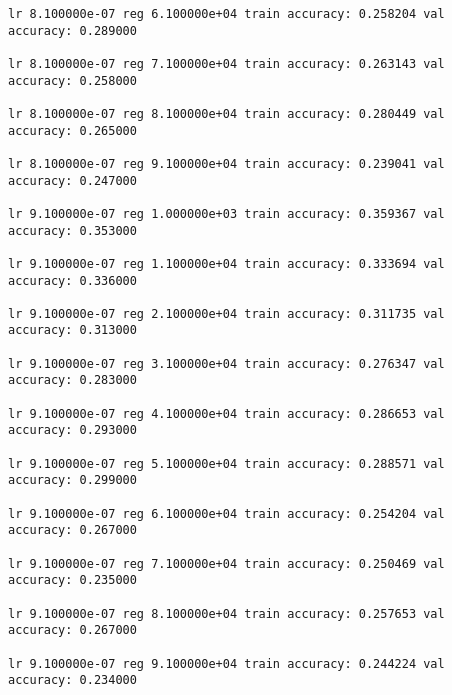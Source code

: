 \documentclass[11pt]{article}
\begin{document}
\begin{Verbatim}[commandchars=\\\{\}]
lr 8.100000e-07 reg 6.100000e+04 train accuracy: 0.258204 val accuracy: 0.289000

lr 8.100000e-07 reg 7.100000e+04 train accuracy: 0.263143 val accuracy: 0.258000

lr 8.100000e-07 reg 8.100000e+04 train accuracy: 0.280449 val accuracy: 0.265000

lr 8.100000e-07 reg 9.100000e+04 train accuracy: 0.239041 val accuracy: 0.247000

lr 9.100000e-07 reg 1.000000e+03 train accuracy: 0.359367 val accuracy: 0.353000

lr 9.100000e-07 reg 1.100000e+04 train accuracy: 0.333694 val accuracy: 0.336000

lr 9.100000e-07 reg 2.100000e+04 train accuracy: 0.311735 val accuracy: 0.313000

lr 9.100000e-07 reg 3.100000e+04 train accuracy: 0.276347 val accuracy: 0.283000

lr 9.100000e-07 reg 4.100000e+04 train accuracy: 0.286653 val accuracy: 0.293000

lr 9.100000e-07 reg 5.100000e+04 train accuracy: 0.288571 val accuracy: 0.299000

lr 9.100000e-07 reg 6.100000e+04 train accuracy: 0.254204 val accuracy: 0.267000

lr 9.100000e-07 reg 7.100000e+04 train accuracy: 0.250469 val accuracy: 0.235000

lr 9.100000e-07 reg 8.100000e+04 train accuracy: 0.257653 val accuracy: 0.267000

lr 9.100000e-07 reg 9.100000e+04 train accuracy: 0.244224 val accuracy: 0.234000


\end{Verbatim}
\end{document}
